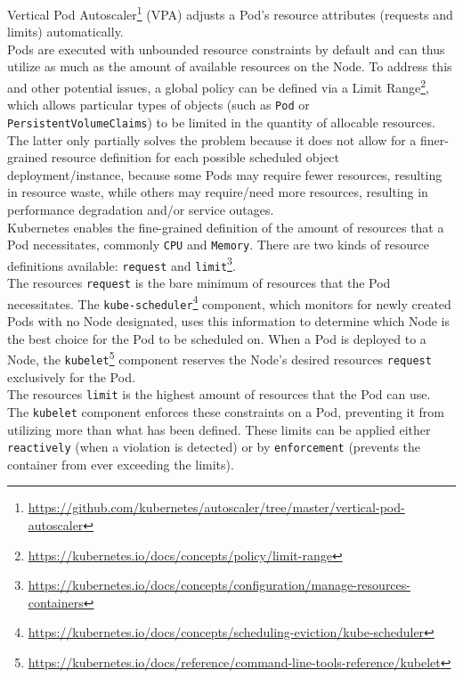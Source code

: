 Vertical Pod Autoscaler\footnote{\url{https://github.com/kubernetes/autoscaler/tree/master/vertical-pod-autoscaler}}
(VPA) adjusts a Pod's resource attributes (requests and limits) automatically.
\\ %

Pods are executed with unbounded resource constraints by default and can thus
utilize as much as the amount of available resources on the Node. To address this
and other potential issues, a global policy can be defined via a Limit Range\footnote{\url{https://kubernetes.io/docs/concepts/policy/limit-range}},
which allows particular types of objects (such as \texttt{Pod} or \texttt{PersistentVolumeClaims})
to be limited in the quantity of allocable resources. The latter only partially
solves the problem because it does not allow for a finer-grained resource
definition for each possible scheduled object deployment/instance, because some Pods
may require fewer resources, resulting in resource waste, while others may require/need
more resources, resulting in performance degradation and/or service outages. \\ %
Kubernetes enables the fine-grained definition of the amount of resources that a
Pod necessitates, commonly \texttt{CPU} and \texttt{Memory}. There are two kinds
of resource definitions available: \texttt{request} and \texttt{limit}\footnote{\url{https://kubernetes.io/docs/concepts/configuration/manage-resources-containers}}.
\\ %
The resources \texttt{request} is the bare minimum of resources that the Pod
necessitates. The \texttt{kube-scheduler}\footnote{\url{https://kubernetes.io/docs/concepts/scheduling-eviction/kube-scheduler}}
component, which monitors for newly created Pods with no Node designated, uses
this information to determine which Node is the best choice for the Pod to be
scheduled on. When a Pod is deployed to a Node, the \texttt{kubelet}\footnote{\url{https://kubernetes.io/docs/reference/command-line-tools-reference/kubelet}}
component reserves the Node's desired resources \texttt{request} exclusively for
the Pod. \\ %
The resources \texttt{limit} is the highest amount of resources that the Pod can
use. The \texttt{kubelet} component enforces these constraints on a Pod,
preventing it from utilizing more than what has been defined. These limits can be
applied either \texttt{reactively} (when a violation is detected) or by \texttt{enforcement}
(prevents the container from ever exceeding the limits). \\ %
